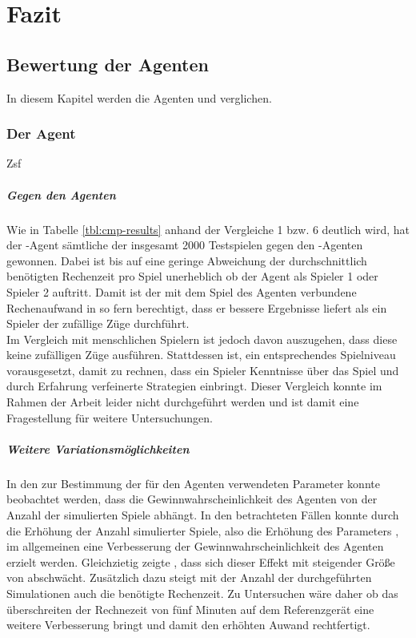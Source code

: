 \chapter{Fazit}

\section{Bewertung der Agenten}
In diesem Kapitel werden die Agenten  und  verglichen.
\subsection{Der Agent }
Zsf 
\paragraph{Gegen den Agenten }
Wie in Tabelle \ref{tbl:cmp-results} anhand der Vergleiche 1 bzw. 6 deutlich wird, hat der -Agent sämtliche der insgesamt 2000 Testspielen gegen den -Agenten gewonnen. Dabei ist bis auf eine geringe Abweichung der durchschnittlich benötigten Rechenzeit pro Spiel unerheblich ob der Agent als Spieler 1 oder Spieler 2 auftritt. Damit ist der mit dem Spiel des Agenten verbundene Rechenaufwand in so fern berechtigt, dass er bessere Ergebnisse liefert als ein Spieler der zufällige Züge durchführt.
\\Im Vergleich mit menschlichen Spielern ist jedoch davon auszugehen, dass diese keine zufälligen Züge ausführen. Stattdessen ist, ein entsprechendes Spielniveau vorausgesetzt, damit zu rechnen, dass ein Spieler Kenntnisse über das Spiel und durch Erfahrung verfeinerte Strategien einbringt. Dieser Vergleich konnte im Rahmen der Arbeit leider nicht durchgeführt werden und ist damit eine Fragestellung für weitere Untersuchungen.  
\paragraph{Weitere Variationsmöglichkeiten}
In den zur Bestimmung der für den Agenten verwendeten Parameter konnte beobachtet werden, dass die Gewinnwahrscheinlichkeit des Agenten von der Anzahl der simulierten Spiele abhängt. In den betrachteten Fällen konnte durch die Erhöhung der Anzahl simulierter Spiele, also die Erhöhung des Parameters , im allgemeinen eine Verbesserung der Gewinnwahrscheinlichkeit des Agenten erzielt werden. Gleichzietig zeigte \cite{nijssen_2007}, dass sich dieser Effekt mit steigender Größe von  abschwächt. Zusätzlich dazu steigt mit der Anzahl der durchgeführten Simulationen auch die benötigte Rechenzeit. Zu Untersuchen wäre daher ob das überschreiten der Rechnezeit von fünf Minuten auf dem Referenzgerät eine weitere Verbesserung bringt und damit den erhöhten Auwand rechtfertigt.

